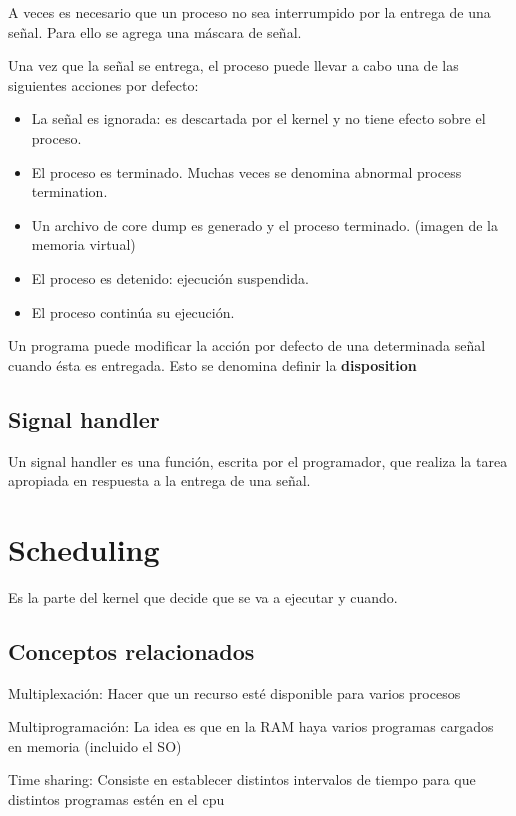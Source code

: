 \documentclass{article}
\begin{document}
A veces es necesario que un proceso no sea interrumpido por la entrega
de una señal. Para ello se agrega una máscara de señal.

Una vez que la señal se entrega, el proceso puede llevar a cabo una de
las siguientes acciones por defecto:

\begin{itemize}
\item
  La señal es ignorada: es descartada por el kernel y no tiene efecto
  sobre el proceso.
\item
  El proceso es terminado. Muchas veces se denomina abnormal process
  termination.
\item
  Un archivo de core dump es generado y el proceso terminado. (imagen de
  la memoria virtual)
\item
  El proceso es detenido: ejecución suspendida.
\item
  El proceso continúa su ejecución.
\end{itemize}

Un programa puede modificar la acción por defecto de una determinada
señal cuando ésta es entregada. Esto se denomina definir la
\textbf{disposition}

\subsection{Signal handler}\label{signal-handler}

Un signal handler es una función, escrita por el programador, que
realiza la tarea apropiada en respuesta a la entrega de una señal.

\section{Scheduling}\label{scheduling}

Es la parte del kernel que decide que se va a ejecutar y cuando.

\subsection{Conceptos relacionados}\label{conceptos-relacionados}

Multiplexación: Hacer que un recurso esté disponible para varios
procesos

Multiprogramación: La idea es que en la RAM haya varios programas
cargados en memoria (incluido el SO)

Time sharing: Consiste en establecer distintos intervalos de tiempo para
que distintos programas estén en el cpu
\end{document}
